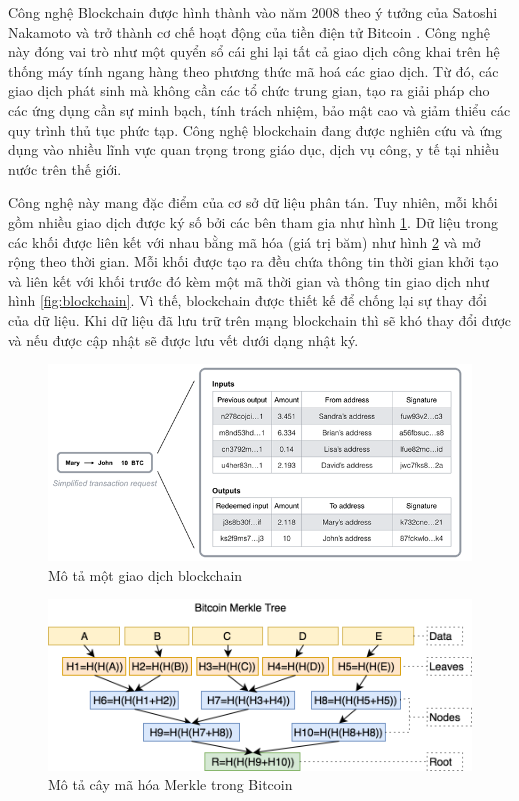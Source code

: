Công nghệ Blockchain được hình thành vào năm 2008 theo ý tưởng của Satoshi Nakamoto và trở thành cơ chế hoạt động của tiền điện tử Bitcoin \cite{nakamoto2008bitcoin}. Công nghệ này đóng vai trò như một quyển sổ cái ghi lại tất cả giao dịch công khai trên hệ thống máy tính ngang hàng theo phương thức mã hoá các giao dịch. Từ đó, các giao dịch phát sinh mà không cần các tổ chức trung gian, tạo ra giải pháp cho các ứng dụng cần sự minh bạch, tính trách nhiệm, bảo mật cao và giảm thiểu các quy trình thủ tục phức tạp. Công nghệ blockchain đang được nghiên cứu và ứng dụng vào nhiều lĩnh vực quan trọng trong giáo dục, dịch vụ công, y tế tại nhiều nước trên thế giới.


Công nghệ này mang đặc điểm của cơ sở dữ liệu phân tán. Tuy nhiên, mỗi khối gồm nhiều giao dịch được ký số bởi các bên tham gia như hình \ref{fig:trans_bitcoin}. Dữ liệu trong các khối được liên kết với nhau bằng mã hóa (giá trị băm) như hình \ref{fig:merkle} và mở rộng theo thời gian. Mỗi khối được tạo ra đều chứa thông tin thời gian khởi tạo và liên kết với khối trước đó kèm một mã thời gian và thông tin giao dịch như hình \ref{fig:blockchain}. Vì thế, blockchain được thiết kế để chống lại sự thay đổi của dữ liệu. Khi dữ liệu đã lưu trữ trên mạng blockchain thì sẽ khó thay đổi được và nếu được cập nhật sẽ được lưu vết dưới dạng nhật ký.

\begin{figure}[htbp]
\centering
\includegraphics[width=.9\linewidth]{img/trans_bitcoin.png}
\caption{Mô tả một giao dịch blockchain}
\label{fig:trans_bitcoin}
\end{figure}


\begin{figure}[htbp]
\centering
\includegraphics[width=.9\linewidth]{img/merkle.png}
\caption{Mô tả cây mã hóa Merkle trong Bitcoin}
\label{fig:merkle}
\end{figure}


